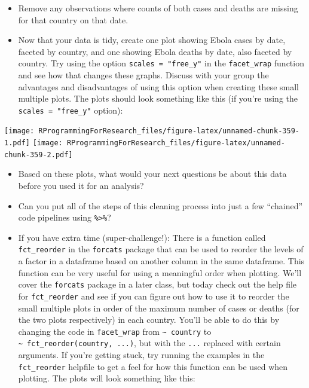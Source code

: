 \documentclass[]{book}
\providecommand{\tightlist}{%
  \setlength{\itemsep}{0pt}\setlength{\parskip}{0pt}}
\theoremstyle{definition}
\theoremstyle{definition}
\theoremstyle{definition}
\theoremstyle{remark}
\begin{document}
\begin{itemize}
\tightlist
\item
  Remove any observations where counts of both cases and deaths are
  missing for that country on that date.
\item
  Now that your data is tidy, create one plot showing Ebola cases by
  date, faceted by country, and one showing Ebola deaths by date, also
  faceted by country. Try using the option \texttt{scales\ =\ "free\_y"}
  in the \texttt{facet\_wrap} function and see how that changes these
  graphs. Discuss with your group the advantages and disadvantages of
  using this option when creating these small multiple plots. The plots
  should look something like this (if you're using the
  \texttt{scales\ =\ "free\_y"} option):
\end{itemize}

\texttt{[image: RProgrammingForResearch\_files/figure-latex/unnamed-chunk-359-1.pdf]}
\texttt{[image: RProgrammingForResearch\_files/figure-latex/unnamed-chunk-359-2.pdf]}

\begin{itemize}
\tightlist
\item
  Based on these plots, what would your next questions be about this
  data before you used it for an analysis?
\item
  Can you put all of the steps of this cleaning process into just a few
  ``chained'' code pipelines using \texttt{\%\textgreater{}\%}?
\item
  If you have extra time (super-challenge!): There is a function called
  \texttt{fct\_reorder} in the \texttt{forcats} package that can be used
  to reorder the levels of a factor in a dataframe based on another
  column in the same dataframe. This function can be very useful for
  using a meaningful order when plotting. We'll cover the
  \texttt{forcats} package in a later class, but today check out the
  help file for \texttt{fct\_reorder} and see if you can figure out how
  to use it to reorder the small multiple plots in order of the maximum
  number of cases or deaths (for the two plots respectively) in each
  country. You'll be able to do this by changing the code in
  \texttt{facet\_wrap} from \texttt{\textasciitilde{}\ country} to
  \texttt{\textasciitilde{}\ fct\_reorder(country,\ ...)}, but with the
  \texttt{...} replaced with certain arguments. If you're getting stuck,
  try running the examples in the \texttt{fct\_reorder} helpfile to get
  a feel for how this function can be used when plotting. The plots will
  look something like this:
\end{itemize}
\end{document}

